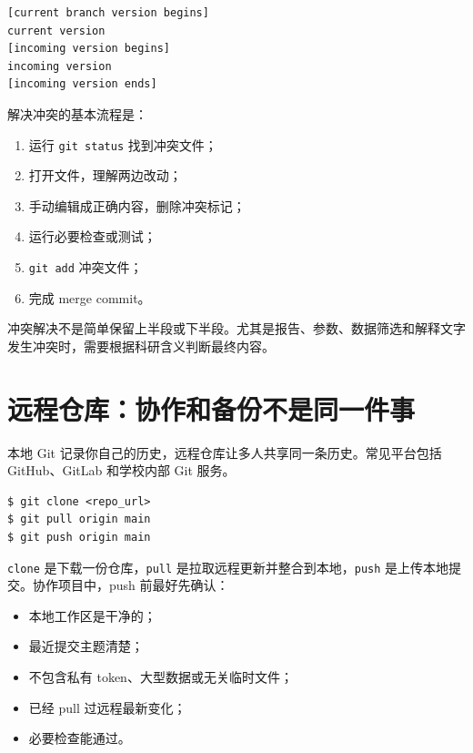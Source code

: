 \begin{lstlisting}[style=terminal]
[current branch version begins]
current version
[incoming version begins]
incoming version
[incoming version ends]
\end{lstlisting}

解决冲突的基本流程是：

\begin{enumerate}
    \item 运行 \texttt{git status} 找到冲突文件；
    \item 打开文件，理解两边改动；
    \item 手动编辑成正确内容，删除冲突标记；
    \item 运行必要检查或测试；
    \item \texttt{git add} 冲突文件；
    \item 完成 merge commit。
\end{enumerate}

\begin{warnbox}[不要机械选择一边]
冲突解决不是简单保留上半段或下半段。尤其是报告、参数、数据筛选和解释文字发生冲突时，需要根据科研含义判断最终内容。
\end{warnbox}

\section{远程仓库：协作和备份不是同一件事}

本地 Git 记录你自己的历史，远程仓库让多人共享同一条历史。常见平台包括 GitHub、GitLab 和学校内部 Git 服务。

\begin{examplebox}[远程仓库基本命令]
\begin{lstlisting}[style=terminal]
$ git clone <repo_url>
$ git pull origin main
$ git push origin main
\end{lstlisting}
\end{examplebox}

\texttt{clone} 是下载一份仓库，\texttt{pull} 是拉取远程更新并整合到本地，\texttt{push} 是上传本地提交。协作项目中，push 前最好先确认：

\begin{itemize}
    \item 本地工作区是干净的；
    \item 最近提交主题清楚；
    \item 不包含私有 token、大型数据或无关临时文件；
    \item 已经 pull 过远程最新变化；
    \item 必要检查能通过。
\end{itemize}


